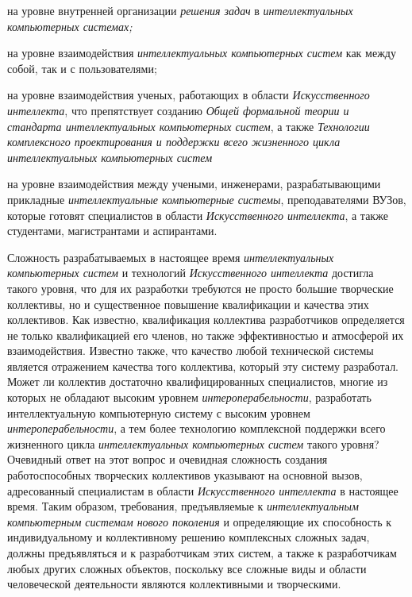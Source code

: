 \begin{textitemize}
	\item
	
	на уровне внутренней организации \textit{решения задач} в \textit{интеллектуальных компьютерных системах;}
	
	\item
	
	на уровне взаимодействия \textit{интеллектуальных компьютерных систем} как между собой, так и с пользователями;
	
	\item
	
	на уровне взаимодействия ученых, работающих в области \textit{Искусственного интеллекта}, что препятствует созданию \textit{Общей формальной теории и стандарта интеллектуальных компьютерных систем}, а также \textit{Технологии комплексного проектирования и поддержки всего жизненного цикла интеллектуальных компьютерных систем}
	
	\item
	
	на уровне взаимодействия между учеными, инженерами, разрабатывающими прикладные \textit{интеллектуальные компьютерные системы}, преподавателями ВУЗов, которые готовят специалистов в области \textit{Искусственного интеллекта}, а также студентами, магистрантами и аспирантами.
	
\end{textitemize}

Сложность разрабатываемых в настоящее время \textit{интеллектуальных компьютерных систем} и технологий \textit{Искусственного интеллекта} достигла такого уровня, что для их разработки требуются не просто большие творческие коллективы, но и существенное повышение квалификации и качества этих коллективов. Как известно, квалификация коллектива разработчиков определяется не только квалификацией его членов, но также эффективностью и атмосферой их взаимодействия. Известно также, что качество любой технической системы является отражением качества того коллектива, который эту систему разработал. Может ли коллектив достаточно квалифицированных специалистов, многие из которых не обладают высоким уровнем \textit{интероперабельности}, разработать интеллектуальную компьютерную систему с высоким уровнем \textit{интероперабельности}, а тем более технологию комплексной поддержки всего жизненного цикла \textit{интеллектуальных компьютерных систем} такого уровня? Очевидный ответ на этот вопрос и очевидная сложность создания работоспособных творческих коллективов указывают на основной вызов, адресованный специалистам в области \textit{Искусственного интеллекта} в настоящее время. Таким образом, требования, предъявляемые к \textit{интеллектуальным компьютерным системам нового поколения} и определяющие их способность к индивидуальному и коллективному решению комплексных сложных задач, должны предъявляться и к разработчикам этих систем, а также к разработчикам любых других сложных объектов, поскольку все сложные виды и области человеческой деятельности являются коллективными и творческими.

